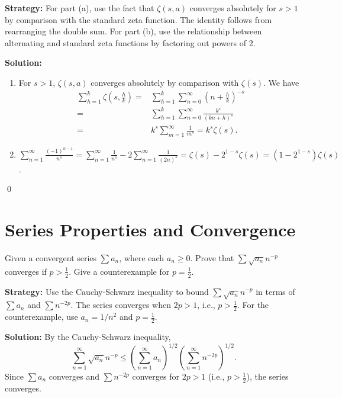 \noindent\textbf{Strategy:} For part (a), use the fact that \(\zeta(s,a)\) converges absolutely for \(s>1\) by comparison with the standard zeta function. The identity follows from rearranging the double sum. For part (b), use the relationship between alternating and standard zeta functions by factoring out powers of 2.

\bigskip\noindent\textbf{Solution:}
\begin{enumerate}[label=(\alph*)]
\item For \(s > 1\), \(\zeta(s, a)\) converges absolutely by comparison with \(\zeta(s)\). We have
\begin{align*}  
\sum_{h=1}^{k} \zeta\left(s, \frac{h}{k}\right) =& \sum_{h=1}^{k} \sum_{n=0}^{\infty} \left(n + \frac{h}{k}\right)^{-s} \\
=& \sum_{h=1}^{k} \sum_{n=0}^{\infty} \frac{k^s}{(kn + h)^s} \\
=& k^s \sum_{m=1}^{\infty} \frac{1}{m^s} = k^s \zeta(s).
\end{align*}

\item \(\sum_{n=1}^{\infty} \frac{(-1)^{n-1}}{n^s} = \sum_{n=1}^{\infty} \frac{1}{n^s} - 2\sum_{n=1}^{\infty} \frac{1}{(2n)^s} = \zeta(s) - 2^{1-s}\zeta(s) = (1 - 2^{1-s})\zeta(s)\).
\end{enumerate}\qed

\section{Series Properties and Convergence}



\begin{problembox}
Given a convergent series \(\sum a_n\), where each \(a_n \geq 0\). Prove that \(\sum \sqrt{a_n} n^{-p}\) converges if \(p > \frac{1}{2}\). Give a counterexample for \(p = \frac{1}{2}\).
\end{problembox}

\noindent\textbf{Strategy:} Use the Cauchy-Schwarz inequality to bound \(\sum \sqrt{a_n} n^{-p}\) in terms of \(\sum a_n\) and \(\sum n^{-2p}\). The series converges when \(2p>1\), i.e., \(p>\frac{1}{2}\). For the counterexample, use \(a_n=1/n^2\) and \(p=\frac{1}{2}\).

\bigskip\noindent\textbf{Solution:}
By the Cauchy-Schwarz inequality,
\[\sum_{n=1}^{\infty} \sqrt{a_n} n^{-p} \leq \left(\sum_{n=1}^{\infty} a_n\right)^{1/2} \left(\sum_{n=1}^{\infty} n^{-2p}\right)^{1/2}.\]
Since \(\sum a_n\) converges and \(\sum n^{-2p}\) converges for \(2p > 1\) (i.e., \(p > \frac{1}{2}\)), the series converges.

